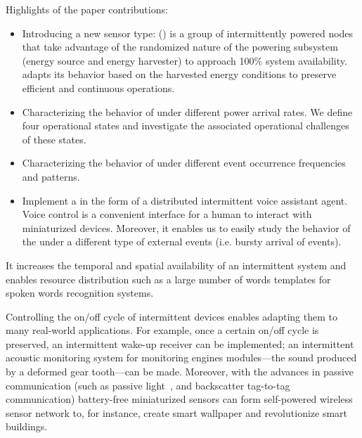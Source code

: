 Highlights of the paper contributions:
\begin{itemize}
		\item Introducing a new sensor type: \textit{\fullsys} (\sys) is a group of intermittently powered nodes that take advantage of the randomized nature of the powering subsystem (energy source and energy harvester) to approach 100\% system availability. \sys adapts its behavior based on the harvested energy conditions to preserve efficient and continuous operations. 
		\item Characterizing the behavior of \fullsys under different power arrival rates. We define four \sys operational states and investigate the associated operational challenges of these states. 
		\item Characterizing the behavior of \fullsys under different event occurrence frequencies and patterns. 
		\item Implement a \fullsys in the form of a distributed intermittent voice assistant agent. Voice control is a convenient interface for a human to interact with miniaturized devices. Moreover, it enables us to easily study the behavior of the \sys under a different type of external events (i.e. bursty arrival of events).
\end{itemize}





%
 It increases the temporal and spatial availability of an intermittent system and enables resource distribution such as a large number of words templates for spoken words recognition systems. 

Controlling the on/off cycle of intermittent devices enables adapting them to many real-world applications. For example, once a certain on/off cycle is preserved, an intermittent wake-up receiver can be implemented; an intermittent acoustic monitoring system for monitoring engines modules---the sound produced by a deformed gear tooth---can be made. Moreover, with the advances in passive communication (such as passive light~\cite{}, and backscatter tag-to-tag~\cite{} communication) battery-free miniaturized sensors can form self-powered wireless sensor network to, for instance, create smart wallpaper and revolutionize smart buildings. 

